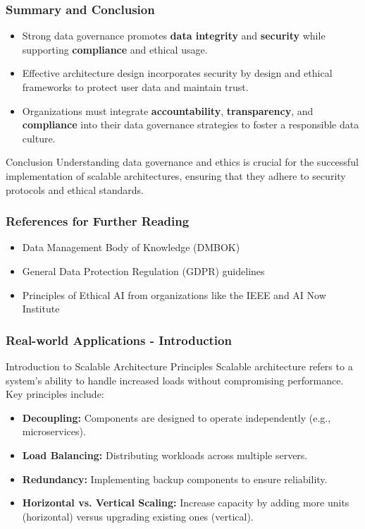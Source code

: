 \documentclass{beamer}
\begin{document}
\begin{frame}[fragile]
    \frametitle{Summary and Conclusion}
    \begin{itemize}
        \item Strong data governance promotes \textbf{data integrity} and \textbf{security} while supporting \textbf{compliance} and ethical usage.
        \item Effective architecture design incorporates security by design and ethical frameworks to protect user data and maintain trust.
        \item Organizations must integrate \textbf{accountability}, \textbf{transparency}, and \textbf{compliance} into their data governance strategies to foster a responsible data culture.
    \end{itemize}
    \begin{block}{Conclusion}
        Understanding data governance and ethics is crucial for the successful implementation of scalable architectures, ensuring that they adhere to security protocols and ethical standards.
    \end{block}
\end{frame}

\begin{frame}[fragile]
    \frametitle{References for Further Reading}
    \begin{itemize}
        \item Data Management Body of Knowledge (DMBOK)
        \item General Data Protection Regulation (GDPR) guidelines
        \item Principles of Ethical AI from organizations like the IEEE and AI Now Institute
    \end{itemize}
\end{frame}

\begin{frame}[fragile]
    \frametitle{Real-world Applications - Introduction}
    \begin{block}{Introduction to Scalable Architecture Principles}
        Scalable architecture refers to a system's ability to handle increased loads without compromising performance. 
        Key principles include:
    \end{block}
    \begin{itemize}
        \item \textbf{Decoupling:} Components are designed to operate independently (e.g., microservices).
        \item \textbf{Load Balancing:} Distributing workloads across multiple servers.
        \item \textbf{Redundancy:} Implementing backup components to ensure reliability.
        \item \textbf{Horizontal vs. Vertical Scaling:} Increase capacity by adding more units (horizontal) versus upgrading existing ones (vertical).
    \end{itemize}
\end{frame}
\end{document}
